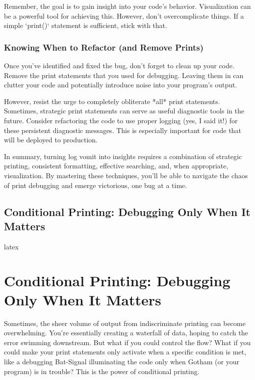 \documentclass{article}
\begin{document}
Remember, the goal is to gain insight into your code's behavior. Visualization can be a powerful tool for achieving this. However, don't overcomplicate things. If a simple `print()` statement is sufficient, stick with that.

\subsection*{Knowing When to Refactor (and Remove Prints)}

Once you've identified and fixed the bug, don't forget to clean up your code. Remove the print statements that you used for debugging. Leaving them in can clutter your code and potentially introduce noise into your program's output.

However, resist the urge to completely obliterate *all* print statements.  Sometimes, strategic print statements can serve as useful diagnostic tools in the future. Consider refactoring the code to use proper logging (yes, I said it!) for these persistent diagnostic messages. This is especially important for code that will be deployed to production.

In summary, turning log vomit into insights requires a combination of strategic printing, consistent formatting, effective searching, and, when appropriate, visualization. By mastering these techniques, you'll be able to navigate the chaos of print debugging and emerge victorious, one bug at a time.

\newpage

\section*{Conditional Printing: Debugging Only When It Matters} %
\label{chapter-1-4-Conditional_Printing__Debugging_Only_Whe}

latex
\chapter{Conditional Printing: Debugging Only When It Matters}

Sometimes, the sheer volume of output from indiscriminate printing can become overwhelming. You're essentially creating a waterfall of data, hoping to catch the error swimming downstream.  But what if you could control the flow? What if you could make your print statements only activate when a specific condition is met, like a debugging Bat-Signal illuminating the code only when Gotham (or your program) is in trouble?  This is the power of conditional printing.
\end{document}
